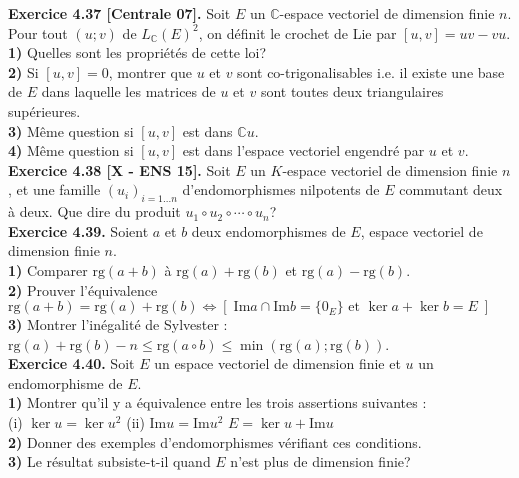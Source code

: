 \documentclass[a4paper,12pt,francais]{article}
\newcommand{\field}[1]{\mathbb{#1}}
\newcommand{\C}{\field{C}}
\newcommand{\im}{\mbox{Im}}
\newcommand{\rg}{\mbox{rg}}
\begin{document}
\noindent
{\bf Exercice 4.37 [Centrale 07].} Soit $E$ un $\C$-espace vectoriel de dimension finie $n$. Pour tout $(u;v)$ de $L_\C(E)^2$, on définit le crochet de Lie par $[u,v]=uv-vu$.\\
\indent
{\bf 1)} Quelles sont les propriétés de cette loi?\\
\indent
{\bf 2)} Si $[u,v]=0$, montrer que $u$ et $v$ sont co-trigonalisables i.e. il existe une base de $E$ dans laquelle les matrices de $u$ et $v$ sont toutes deux triangulaires supérieures.\\
\indent
{\bf 3)} Même question si $[u,v]$ est dans $\C u$.\\
\indent
{\bf 4)} Même question si $[u,v]$ est dans l'espace vectoriel engendré par $u$ et $v$.\\

\noindent
{\bf Exercice 4.38 [X - ENS 15].} Soit $E$ un $K$-espace vectoriel de dimension finie $n$, et une famille $(u_i)_{i =1...n}$ d'endomorphismes nilpotents de $E$ commutant deux à deux. Que dire du produit $u_1\circ u_2\circ \cdots \circ u_n$?\\

\noindent
{\bf Exercice 4.39.} Soient $a$ et $b$ deux endomorphismes de $E$, espace vectoriel de dimension finie $n$.\\
{\bf 1)} Comparer $\rg(a+b)$ à $\rg(a)+\rg(b)$ et $\rg(a)-\rg(b)$.\\
{\bf 2)} Prouver l'équivalence
$\displaystyle \rg(a+b)=\rg(a)+\rg(b) \Longleftrightarrow \left[ { \; \im a \cap \im b =\{0_E\} \mbox { et } \ker a +\ker b=E \; }\right]$\\
{\bf 3)} Montrer l'inégalité de Sylvester : $\rg(a)+\rg(b)-n \leqslant \rg (a \circ b) \leqslant \min (\rg(a);\rg(b))$.\\

\noindent
{\bf Exercice 4.40.} Soit $E$ un espace vectoriel de dimension finie et $u$ un endomorphisme de $E$.\\
{\bf 1)} Montrer qu'il y a équivalence entre les trois assertions suivantes :\\
\indent
(i) $\ker u =\ker u^2$ \hspace{1cm} (ii) $\im u =\im u^2$ \hspace{1cm} $E=\ker u+\im u$\\
{\bf 2)} Donner des exemples d'endomorphismes vérifiant ces conditions.\\
{\bf 3)} Le résultat subsiste-t-il quand $E$ n'est plus de dimension finie?\\
\end{document}
